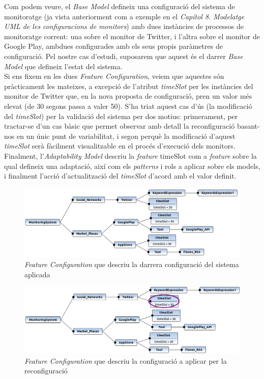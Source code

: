 Com podem veure, el \textit{Base Model} defineix una configuració del sistema de monitoratge (ja vista anteriorment com a exemple en el \textit{Capítol 8. Modelatge UML de les configuracions de monitors}) amb dues instàncies de processos de monitoratge corrent: una sobre el monitor de Twitter, i l'altra sobre el monitor de Google Play, ambdues configurades amb els seus propis paràmetres de configuració. Pel nostre cas d'estudi, suposarem que aquest és el darrer \textit{Base Model} que defineix l'estat del sistema.\\

Si ens fixem en les dues \textit{Feature Configuration}, veiem que aquestes són pràcticament les mateixes, a excepció de l'atribut \textit{timeSlot} per les instàncies del monitor de Twitter que, en la nova proposta de configuració, pren un valor més elevat (de 30 segons passa a valer 50). S'ha triat aquest cas d'ús (la modificació del \textit{timeSlot}) per la validació del sistema per dos motius: primerament, per tractar-se d'un cas bàsic que permet observar amb detall la reconfiguració basant-nos en un únic punt de variabilitat, i segon perquè la modificació d'aquest \textit{timeSlot} serà fàcilment visualitzable en el procés d'execució dels monitors.\\ 

Finalment, l'\textit{Adaptability Model} descriu la \textit{feature} timeSlot com a \textit{feature} sobre la qual defineix una adaptació, així com els \textit{patterns} i rols a aplicar sobre els models, i finalment l'acció d'actualització del \textit{timeSlot} d'acord amb el valor definit.\\

\begin{figure}
\centering
\includegraphics[width=14cm]{Figures/Figure36}
\decoRule
\caption{\textit{Feature Configuration} que descriu la darrera configuració del sistema aplicada}
\label{fig:Figura37}
\end{figure} 

\begin{figure}
\centering
\includegraphics[width=14cm]{Figures/Figure37}
\decoRule
\caption{\textit{Feature Configuration} que descriu la configuració a aplicar per la reconfiguració}
\label{fig:Figura38}
\end{figure} 

